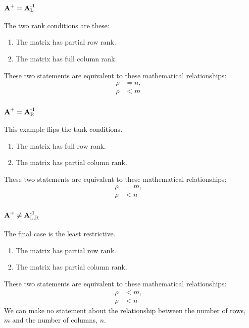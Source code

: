 \subsubsection{$\operatorname{\textbf{A}^{\mathrm{+}}}=\operatorname{\textbf{A}^{\mathrm{-1}}_{\mathrm{L}}}$}
The two rank conditions are these:
\begin{enumerate}
\item The matrix has partial row rank.
\item The matrix has full column rank.
\end{enumerate}
These two statements are equivalent to these mathematical relationships:
\begin{equation}
  \begin{split}
     \rho &= n, \\
     \rho &< m
  \end{split}
\end{equation}

\subsubsection{$\operatorname{\textbf{A}^{\mathrm{+}}}=\operatorname{\textbf{A}^{\mathrm{-1}}_{\mathrm{R}}}$}
This example flips the tank conditions.
\begin{enumerate}
\item The matrix has full row rank.
\item The matrix has partial column rank.
\end{enumerate}
These two statements are equivalent to these mathematical relationships:
\begin{equation}
  \begin{split}
     \rho &= m, \\
     \rho &< n
  \end{split}
\end{equation}


\subsubsection{$\operatorname{\textbf{A}^{\mathrm{+}}}\ne\operatorname{\textbf{A}^{\mathrm{-1}}_{\mathrm{L,R}}}$}
The final case is the least restrictive.
\begin{enumerate}
\item The matrix has partial row rank.
\item The matrix has partial column rank.
\end{enumerate}
These two statements are equivalent to these mathematical relationships:
\begin{equation}
  \begin{split}
     \rho &< m, \\
     \rho &< n
  \end{split}
\end{equation}
We can make no statement about the relationship between the number of rows, $m$ and the number of columns, $n$.

